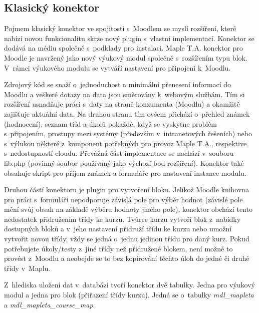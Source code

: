 \documentclass[
print,
  11pt,
  table,   
  nolof,    
  nolot,
  oneside,final
]{fithesis3}
\begin{document}
		\subsection{Klasický konektor}
Pojmem klasický konektor ve spojitosti s~Moodlem se myslí rozšíření, které nabízí novou funkcionalitu skrze nový plugin s~vlastní implementací. Konektor se dodává na médiu společně s~podklady pro instalaci. Maple T.A. konektor pro Moodle je navržený jako nový výukový modul společně s~rozšířením typu blok. V~rámci výukového modulu se vytváří nastavení pro připojení k~Moodlu. 

Zdrojový kód se snaží o~jednoduchost a minimální přenesení informací do Moodlu a veškeré dotazy na data jsou směrovány k~webovým službám. Tím si rozšíření usnadňuje práci s~daty na straně konzumenta (Moodlu) a okamžitě zajišťuje aktuální data. Na druhou stranu tím ovšem přichází o~přehled známek (hodnocení), seznam tříd a úkolů pokaždé, když se vyskytne problém s~připojením, prostupy mezi systémy (především v~intranetových řešeních) nebo s~výlukou některé z~komponent potřebných pro provoz Maple T.A., respektive s~nedostupností cloudu. Převážná část implementace se nachází v~souboru lib.php (povinný soubor používaný jako výchozí bod rozšíření). Konektor také obsahuje skript pro příjem známek a formuláře pro nastavení instance modulu. 

Druhou částí konektoru je plugin pro vytvoření bloku. Jelikož Moodle knihovna pro práci s~formuláři nepodporuje závislá pole pro výběr hodnot (závislé pole mění svůj obsah na základě výběru hodnoty jiného pole), konektor obchází tento nedostatek přidružením třídy ke kurzu. Tvůrce kurzu vytvoří blok z~nabídky dostupných bloků a v~jeho nastavení přidruží třídu ke kurzu nebo umožní vytvořit novou třídy, vždy se jedná o~jednu jedinou třídu pro daný kurz. Pokud potřebujete úkoly/testy z~jiné třídy než přidružené blokem, není možné to provést z~Moodlu a neobejde se to bez kopírování těchto úloh do jedné či druhé třídy v~Maplu. 

Z~hlediska uložení dat v~databázi tvoří konektor dvě tabulky. Jedna pro výukový modul a jedna pro blok (přiřazení třídy kurzu). Jedná se o~tabulky  \emph{mdl\_mapleta} a\emph{ mdl\_mapleta\_course\_map}.
\end{document}
